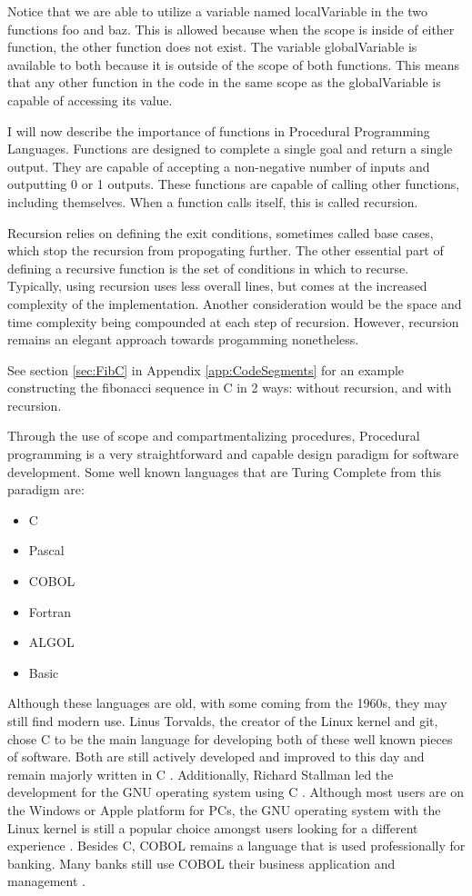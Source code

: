 Notice that we are able to utilize a variable named localVariable in the two functions foo and baz.
This is allowed because when the scope is inside of either function, the other function does not exist.
The variable globalVariable is available to both because it is outside of the scope of both functions.
This means that any other function in the code in the same scope as the globalVariable is capable of accessing its value.

I will now describe the importance of functions in Procedural Programming Languages.
Functions are designed to complete a single goal and return a single output.
They are capable of accepting a non-negative number of inputs and outputting 0 or 1 outputs.
These functions are capable of calling other functions, including themselves.
When a function calls itself, this is called recursion.

Recursion relies on defining the exit conditions, sometimes called base cases, which stop the recursion from propogating further.
The other essential part of defining a recursive function is the set of conditions in which to recurse.
Typically, using recursion uses less overall lines, but comes at the increased complexity of the implementation.
Another consideration would be the space and time complexity being compounded at each step of recursion.
However, recursion remains an elegant approach towards progamming nonetheless.

See section \ref{sec:FibC} in Appendix \ref{app:CodeSegments} for an example constructing the fibonacci sequence in C in 2 ways: without recursion, and with recursion.

Through the use of scope and compartmentalizing procedures, Procedural programming is a very straightforward and capable design paradigm for software development.
Some well known languages that are Turing Complete from this paradigm are: 

\begin{itemize}
    \item C
    \item Pascal
    \item COBOL
    \item Fortran
    \item ALGOL
    \item Basic        
\end{itemize}

Although these languages are old, with some coming from the 1960s, they may still find modern use.
Linus Torvalds, the creator of the Linux kernel and git, chose C to be the main language for developing both of these well known pieces of software.
Both are still actively developed and improved to this day and remain majorly written in C \cite{GitMadeinC,LinuxMadeinC}.
Additionally, Richard Stallman led the development for the GNU operating system using C \cite{GNUPreferC}.
Although most users are on the Windows or Apple platform for PCs, the GNU operating system with the Linux kernel is still a popular choice amongst users looking for a different experience \cite{MarketShareOS}.
Besides C, COBOL remains a language that is used professionally for banking.
Many banks still use COBOL their business application and management \cite{COBOLBanks}.

